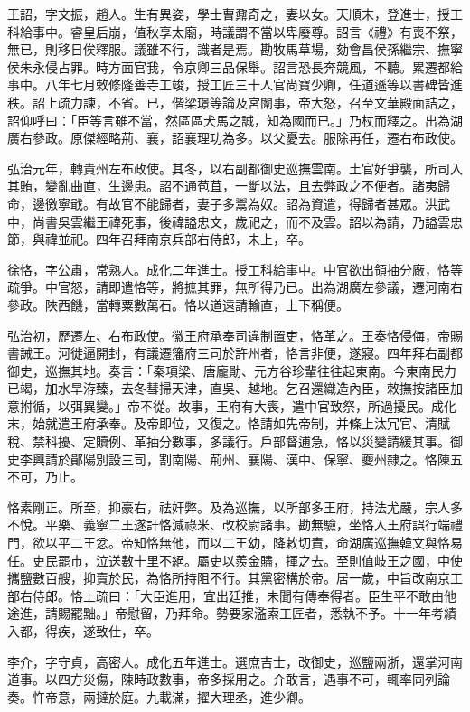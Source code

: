 \begin{pinyinscope}
王詔，字文振，趙人。生有異姿，學士曹鼐奇之，妻以女。天順末，登進士，授工科給事中。睿皇后崩，值秋享太廟，時議謂不當以卑廢尊。詔言《禮》有喪不祭，無已，則移日俟釋服。議雖不行，識者是焉。勘牧馬草場，劾會昌侯孫繼宗、撫寧侯朱永侵占罪。時方面官我，令京卿三品保舉。詔言恐長奔競風，不聽。累遷都給事中。八年七月敕修隆善寺工竣，授工匠三十人官尚寶少卿，任道遜等以書碑皆進秩。詔上疏力諫，不省。已，偕梁璟等論及宮闈事，帝大怒，召至文華殿面詰之，詔仰呼曰：「臣等言雖不當，然區區犬馬之誠，知為國而已。」乃杖而釋之。出為湖廣右參政。原傑經略荊、襄，詔襄理功為多。以父憂去。服除再任，遷右布政使。

弘治元年，轉貴州左布政使。其冬，以右副都御史巡撫雲南。土官好爭襲，所司入其賄，變亂曲直，生邊患。詔不通苞苴，一斷以法，且去弊政之不便者。諸夷歸命，邊徼寧戢。有故官不能歸者，妻子多鬻為奴。詔為資遣，得歸者甚眾。洪武中，尚書吳雲繼王禕死事，後禕謚忠文，歲祀之，而不及雲。詔以為請，乃謚雲忠節，與禕並祀。四年召拜南京兵部右侍郎，未上，卒。

徐恪，字公肅，常熟人。成化二年進士。授工科給事中。中官欲出領抽分廠，恪等疏爭。中官怒，請即遣恪等，將摭其罪，無所得乃已。出為湖廣左參議，遷河南右參政。陜西饑，當轉粟數萬石。恪以道遠請輸直，上下稱便。

弘治初，歷遷左、右布政使。徽王府承奉司違制置吏，恪革之。王奏恪侵侮，帝賜書誡王。河徙逼開封，有議遷籓府三司於許州者，恪言非便，遂寢。四年拜右副都御史，巡撫其地。奏言：「秦項梁、唐龐勛、元方谷珍輩往往起東南。今東南民力已竭，加水旱洊臻，去冬彗掃天津，直吳、越地。乞召還織造內臣，敕撫按諸臣加意拊循，以弭異變。」帝不從。故事，王府有大喪，遣中官致祭，所過擾民。成化末，始就遣王府承奉。及帝即位，又復之。恪請如先帝制，并條上汰冗官、清賦稅、禁科擾、定贖例、革抽分數事，多議行。戶部督逋急，恪以災變請緩其事。御史李興請於鄖陽別設三司，割南陽、荊州、襄陽、漢中、保寧、夔州隸之。恪陳五不可，乃止。

恪素剛正。所至，抑豪右，祛奸弊。及為巡撫，以所部多王府，持法尤嚴，宗人多不悅。平樂、義寧二王遂訐恪減祿米、改校尉諸事。勘無驗，坐恪入王府誤行端禮門，欲以平二王忿。帝知恪無他，而以二王幼，降敕切責，命湖廣巡撫韓文與恪易任。吏民罷市，泣送數十里不絕。屬吏以羨金贐，揮之去。至則值岐王之國，中使攜鹽數百艘，抑賣於民，為恪所持阻不行。其黨密構於帝。居一歲，中旨改南京工部右侍郎。恪上疏曰：「大臣進用，宜出廷推，未聞有傳奉得者。臣生平不敢由他途進，請賜罷黜。」帝慰留，乃拜命。勢要家濫索工匠者，悉執不予。十一年考績入都，得疾，遂致仕，卒。

李介，字守貞，高密人。成化五年進士。選庶吉士，改御史，巡鹽兩浙，還掌河南道事。以四方災傷，陳時政數事，帝多採用之。介敢言，遇事不可，輒率同列論奏。忤帝意，兩撻於庭。九載滿，擢大理丞，進少卿。


\end{pinyinscope}
